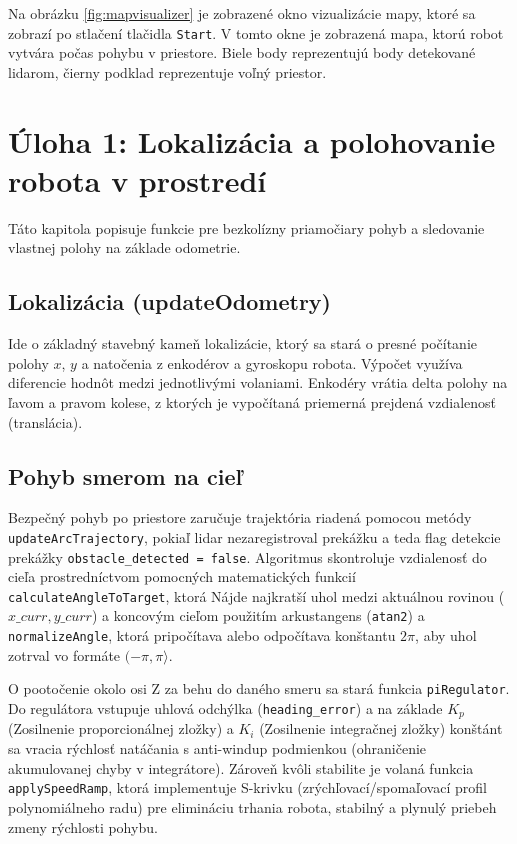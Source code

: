 Na obrázku \ref{fig:mapvisualizer} je zobrazené okno vizualizácie mapy, ktoré sa zobrazí po stlačení tlačidla \texttt{Start}. V tomto okne je zobrazená mapa, ktorú robot vytvára počas pohybu v priestore. Biele body reprezentujú body detekované lidarom, čierny podklad reprezentuje voľný priestor.




\newpage
\section{Úloha 1: Lokalizácia a polohovanie robota v prostredí}
Táto kapitola popisuje funkcie pre bezkolízny priamočiary pohyb a sledovanie vlastnej polohy na základe odometrie.

\subsection{Lokalizácia (updateOdometry)}
Ide o základný stavebný kameň lokalizácie, ktorý sa stará o presné počítanie polohy $x$, $y$ a natočenia z enkodérov a gyroskopu robota. Výpočet využíva diferencie hodnôt medzi jednotlivými volaniami. 
Enkodéry vrátia delta polohy na ľavom a pravom kolese, z ktorých je vypočítaná priemerná prejdená vzdialenosť (translácia).

\subsection{Pohyb smerom na cieľ}
Bezpečný pohyb po priestore zaručuje trajektória riadená pomocou metódy \newline \noindent\texttt{updateArcTrajectory}, pokiaľ lidar nezaregistroval prekážku a teda flag detekcie prekážky \texttt{obstacle\_detected = false}.
Algoritmus skontroluje vzdialenosť do cieľa prostredníctvom pomocných matematických funkcií \texttt{calculateAngleToTarget}, ktorá Nájde najkratší uhol medzi aktuálnou rovinou ($x\_curr, y\_curr$) a koncovým cieľom použitím arkustangens (\texttt{atan2}) a \texttt{normalizeAngle}, ktorá pripočítava alebo odpočítava konštantu $2\pi$, aby uhol zotrval vo formáte $(-\pi, \pi \rangle$.


O pootočenie okolo osi Z za behu do daného smeru sa stará funkcia \texttt{piRegulator}. Do regulátora vstupuje uhlová odchýlka (\texttt{heading\_error}) a na základe $K_p$ (Zosilnenie proporcionálnej zložky) a $K_i$ (Zosilnenie integračnej zložky) konštánt sa vracia rýchlosť natáčania s anti-windup podmienkou (ohraničenie akumulovanej chyby v integrátore). 
Zároveň kvôli stabilite je volaná funkcia \texttt{applySpeedRamp}, ktorá implementuje S-krivku (zrýchľovací/spomaľovací profil polynomiálneho radu) pre elimináciu trhania robota, stabilný a plynulý priebeh zmeny rýchlosti pohybu.



